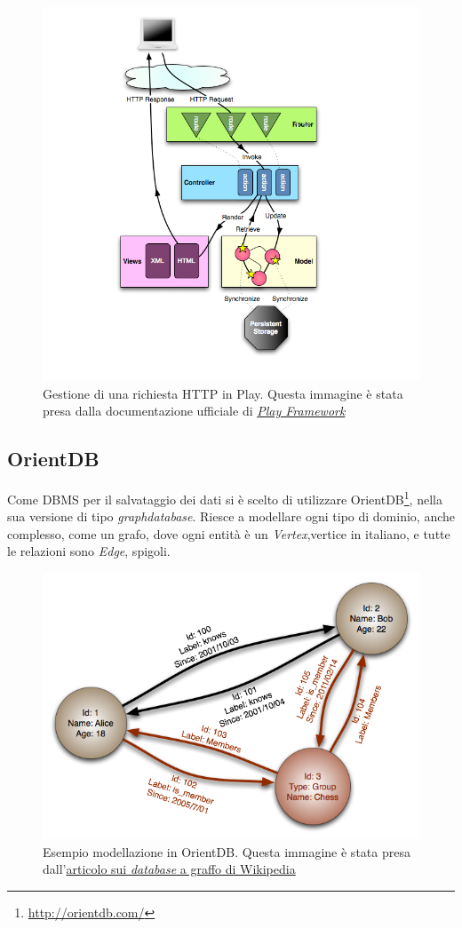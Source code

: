 \begin{figure}[h]
\centering
\includegraphics[width=0.8\linewidth]{immagini/diagrams_path}
\caption[Gestione di una richiesta HTTP in Play]{Gestione di una richiesta HTTP in Play. Questa immagine è stata presa dalla documentazione ufficiale di \href{https://www.playframework.com/documentation/1.0/main}{\textit{Play Framework}}}
\label{fig:diagrams_path}
\end{figure}

\newpage
\subsection*{OrientDB}
Come DBMS per il salvataggio dei dati si è scelto di utilizzare OrientDB\footnote{\url{http://orientdb.com/}}, nella sua versione di tipo \textit{graphdatabase}. Riesce a modellare ogni tipo di dominio, anche complesso, come un grafo, dove ogni entità è un \textit{Vertex},vertice in italiano, e tutte le relazioni sono \textit{Edge}, spigoli.
\begin{figure}[h]
\centering
\includegraphics[width=0.8\linewidth]{immagini/GraphDatabase_PropertyGraph}
\caption[Esempio modellazione in OrientDB]{Esempio modellazione in OrientDB. Questa immagine è stata presa dall'\href{https://en.wikipedia.org/wiki/Graph_database}{articolo sui \textit{database} a graffo di Wikipedia}}
\label{fig:GraphDatabase_PropertyGraph}
\end{figure}


